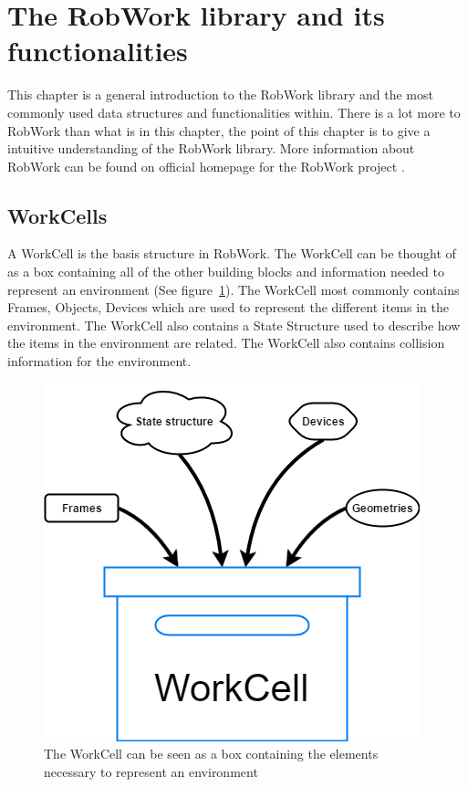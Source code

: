 \section{The RobWork library and its functionalities}
\label{sec:RW_lib_and_func}
This chapter is a general introduction to the RobWork library and the most commonly used data structures and functionalities within. There is a lot more to RobWork than what is in this chapter, the point of this chapter is to give a intuitive understanding of the RobWork library. More information about RobWork can be found on official homepage for the RobWork project \cite{RW_Webpage}.


\subsection{WorkCells}
A WorkCell is the basis structure in RobWork. The WorkCell can be thought of as a box containing all of the other building blocks and information needed to represent an environment (See figure~\ref{fig:WorkCellBoxExample}). The WorkCell most commonly contains Frames, Objects, Devices which are used to represent the different items in the environment. The WorkCell also contains a State Structure used to describe how the items in the environment are related. The WorkCell also contains collision information for the environment.

\begin{figure}[h]
	\centering
	\includegraphics[scale=0.55]{Figures/WorkCellBoxExample.png}
	\caption{The WorkCell can be seen as a box containing the elements necessary to represent an environment}
	\label{fig:WorkCellBoxExample}
\end{figure}


